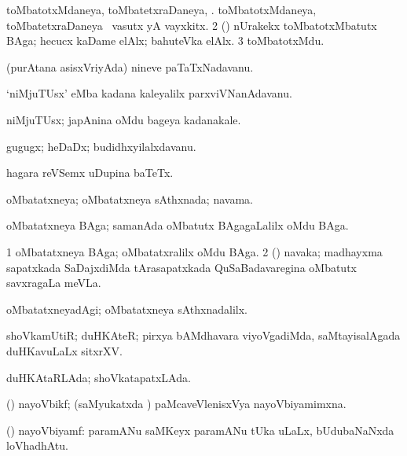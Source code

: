 \noindent
\gl{\pagu}
\bmng
\bnum
{}  
\banum
{} toMbatotxMdaneya, toMbatetxraDaneya, \mo. 
 toMbatotxMdaneya, toMbatetxraDaneya \mo\ vasutx yA vayxkitx. 
\eanum
\numie
\num{2} (\rUpa) nUrakekx toMbatotxMbatutx BAga; hecucx kaDame elAlx; bahuteVka elAlx. 
\num{3}  toMbatotxMdu. 
\enum
\emng
\eentry

\bentry
{}
\gl{\nA}
\bmng
(purAtana asisxVriyAda) nineve paTaTxNadavanu. 
\emng
\eentry

\bentry
{}
\gl{\nA}
\bmng
`niMjuTUsx' eMba kadana kaleyalilx parxviVNanAdavanu. 
\emng
\eentry

\bentry
{}
\gl{\nA}
\bmng
niMjuTUsx; japAnina oMdu bageya kadanakale. 
\emng
\eentry

\bentry
{}
\gl{\nA}
\bmng
gugugx; heDaDx; budidhxyilalxdavanu. 
\emng
\eentry

\bentry
{}
\gl{\nA}
\bmng
hagara reVSemx uDupina baTeTx. 
\emng
\eentry

\bentry
{}
\gl{\gu}
\bmng
oMbatatxneya; oMbatatxneya sAthxnada; navama. 
\emng

\noindent
\gl{\pagu}
\bmng
{} oMbatatxneya BAga; samanAda oMbatutx BAgagaLalilx oMdu BAga. 
\emng
\eentry

\bentry
{}
\gl{\nA}
\bmng
\bnum
\num{1} oMbatatxneya BAga; oMbatatxralilx oMdu BAga. 
\num{2} (\saM) navaka; madhayxma sapatxkada SaDajxdiMda tArasapatxkada QuSaBadavaregina oMbatutx savxragaLa meVLa. 
\enum
\emng
\eentry

\bentry
{}
\gl{\kirxvi}
\bmng
oMbatatxneyadAgi; oMbatatxneya sAthxnadalilx. 
\emng
\eentry

\bentry
{}
\gl{\nA}
\bmng
shoVkamUtiR; duHKAteR; pirxya bAMdhavara viyoVgadiMda, saMtayisalAgada duHKavuLaLx sitxrXV. 
\emng
\eentry

\bentry
{}
\gl{\gu}
\bmng
duHKAtaRLAda; shoVkatapatxLAda. 
\emng
\eentry

\bentry
{}
\gl{\gu}
\bmng
(\ravi) nayoVbikf; (saMyukatxda \vi) paMcaveVlenisxVya nayoVbiyamimxna. 
\emng
\eentry

\bentry
{}
\gl{\nA}
\bmng
(\ravi) nayoVbiyamf: paramANu saMKeyx  paramANu tUka  uLaLx, bUdubaNaNxda loVhadhAtu. 
\emng
\eentry


